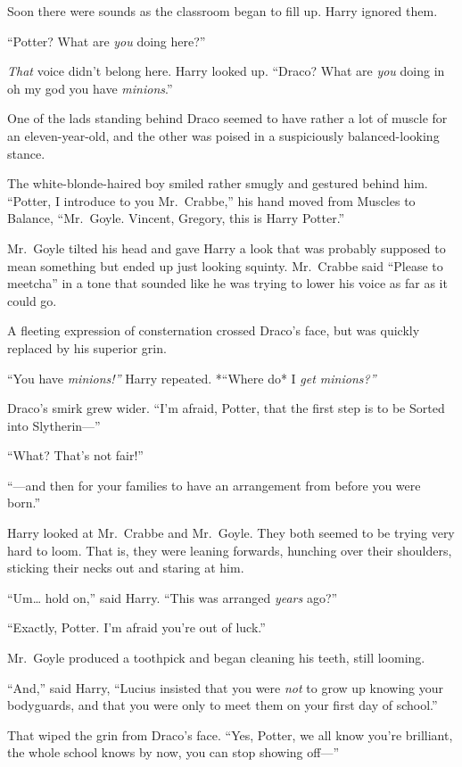 Soon there were sounds as the classroom began to fill up. Harry ignored
them.

``Potter? What are \emph{you} doing here?''

\emph{That} voice didn't belong here. Harry looked up. ``Draco? What are
\emph{you} doing in oh my god you have \emph{minions}.''

One of the lads standing behind Draco seemed to have rather a lot of
muscle for an eleven-year-old, and the other was poised in a
suspiciously balanced-looking stance.

The white-blonde-haired boy smiled rather smugly and gestured behind
him. ``Potter, I introduce to you Mr.~Crabbe,'' his hand moved from
Muscles to Balance, ``Mr.~Goyle. Vincent, Gregory, this is Harry
Potter.''

Mr.~Goyle tilted his head and gave Harry a look that was probably
supposed to mean something but ended up just looking squinty. Mr.~Crabbe
said ``Please to meetcha'' in a tone that sounded like he was trying to
lower his voice as far as it could go.

A fleeting expression of consternation crossed Draco's face, but was
quickly replaced by his superior grin.

``You have \emph{minions!''} Harry repeated. *``Where do* I \emph{get
minions?''}

Draco's smirk grew wider. ``I'm afraid, Potter, that the first step is
to be Sorted into Slytherin---''

``What? That's not fair!''

``---and then for your families to have an arrangement from before you
were born.''

Harry looked at Mr.~Crabbe and Mr.~Goyle. They both seemed to be trying
very hard to loom. That is, they were leaning forwards, hunching over
their shoulders, sticking their necks out and staring at him.

``Um\ldots{} hold on,'' said Harry. ``This was arranged \emph{years}
ago?''

``Exactly, Potter. I'm afraid you're out of luck.''

Mr.~Goyle produced a toothpick and began cleaning his teeth, still
looming.

``And,'' said Harry, ``Lucius insisted that you were \emph{not} to grow
up knowing your bodyguards, and that you were only to meet them on your
first day of school.''

That wiped the grin from Draco's face. ``Yes, Potter, we all know you're
brilliant, the whole school knows by now, you can stop showing off---''

